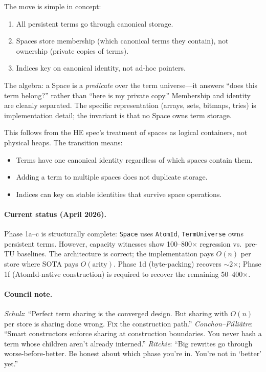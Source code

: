 \documentclass[11pt]{article}
\newcommand{\code}[1]{\texttt{#1}}
\begin{document}
The move is simple in concept:
\begin{enumerate}
\item All persistent terms go through canonical storage.
\item Spaces store membership (which canonical terms they contain),
  not ownership (private copies of terms).
\item Indices key on canonical identity, not ad-hoc pointers.
\end{enumerate}

The algebra: a Space is a \emph{predicate} over the term universe---it
answers ``does this term belong?'' rather than ``here is my private copy.''
Membership and identity are cleanly separated.  The specific representation
(arrays, sets, bitmaps, tries) is implementation detail; the invariant is
that no Space owns term storage.

This follows from the HE spec's treatment of spaces as logical containers,
not physical heaps.  The transition means:
\begin{itemize}
\item Terms have one canonical identity regardless of which spaces contain them.
\item Adding a term to multiple spaces does not duplicate storage.
\item Indices can key on stable identities that survive space operations.
\end{itemize}

\paragraph{Current status (April 2026).}
Phase 1a--c is structurally complete: \code{Space} uses \code{AtomId},
\code{TermUniverse} owns persistent terms.  However, capacity witnesses show
100--800$\times$ regression vs.\ pre-TU baselines.  The architecture is correct;
the implementation pays $O(n)$ per store where SOTA pays $O(\mathrm{arity})$.
Phase 1d (byte-packing) recovers $\sim$2$\times$; Phase 1f (AtomId-native
construction) is required to recover the remaining 50--400$\times$.

\paragraph{Council note.}
\emph{Schulz}: ``Perfect term sharing is the converged design.  But sharing
with $O(n)$ per store is sharing done wrong.  Fix the construction path.''
\emph{Conchon--Filli\^{a}tre}: ``Smart constructors enforce sharing at
construction boundaries.  You never hash a term whose children aren't
already interned.''
\emph{Ritchie}: ``Big rewrites go through worse-before-better.  Be honest
about which phase you're in.  You're not in `better' yet.''
\end{document}
